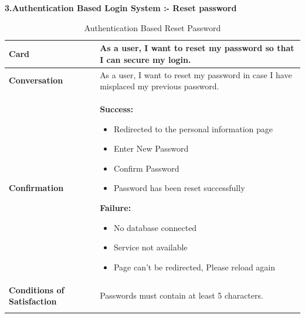 \textbf{3.Authentication Based Login System :- Reset password}
\begin{center}
\setlength{\tabcolsep}{0.8cm}
\renewcommand{\arraystretch}{1.2}
        \centering
        \begin{longtable}{|m{70pt}|p{9cm}|}
            \hline
                \textbf{Card} &
                As a user, I want to reset my password so that I can secure my login.\\
            \hline
                \textbf{Conversation} &
                    As a user, I want to reset my password in case I have misplaced my previous password. \\
            \hline
                \textbf{Confirmation} &
                     \textbf{ Success:}
                        \begin{itemize}
                            \item  Redirected to the personal information page
                            \item  Enter New Password
                            \item  Confirm Password
                            \item   Password has been reset successfully
                        \end{itemize}
                    \textbf{Failure:}
                        \begin{itemize}
                            \item  No database connected
                            \item  Service not available
                            \item  Page can't be redirected, Please reload again
                        \end{itemize}  \\
            \hline
                \textbf{Conditions of Satisfaction} &  
                    Passwords must contain at least 5 characters. \\
            \hline
        \caption{Authentication Based Reset Password}
        \label{tab:my_label}
        \end{longtable}
\end{center}

